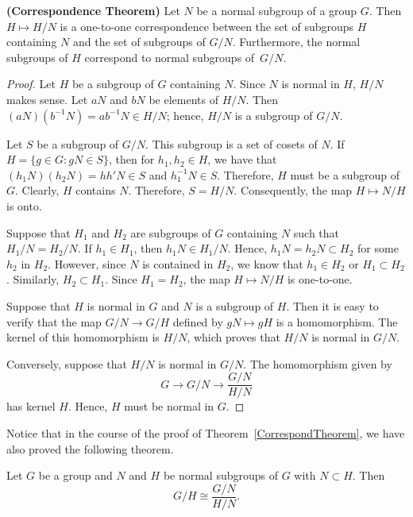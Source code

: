  
\begin{theorem} {\bf (Correspondence Theorem)}\label{CorrespondTheorem}
Let $N$ be a normal subgroup of a group $G$. Then $H \mapsto H/N$
is a one-to-one correspondence between the set of subgroups $H$
containing $N$  and the set of subgroups of $G/N$. Furthermore, the
normal subgroups of $H$ correspond to normal subgroups of~$G/N$. 
\end{theorem}
 
 
\begin{proof}
Let $H$ be a subgroup of $G$ containing $N$. Since $N$ is normal in
$H$, $H/N$ makes sense.  Let $aN$ and $bN$ be elements of $H/N$. Then
$(aN)( b^{-1} N )= ab^{-1}N \in H/N$; hence, $H/N$ is a subgroup of
$G/N$. 


Let $S$ be a subgroup of $G/N$. This subgroup is a set of cosets of
$N$.  If  $H= \{ g \in G : gN \in S \}$, then for $h_1, h_2 \in H$, we
have that $(h_1 N)( h_2 N )= h h' N \in S$ and $h_1^{-1} N \in S$.
Therefore, $H$ must be a subgroup of $G$. Clearly, $H$ contains $N$.
Therefore, $S = H / N$. Consequently, the map  $H \mapsto N/H$ is
onto. 

 
Suppose that $H_1$ and $H_2$ are subgroups of $G$ containing $N$ such
that $H_1/N = H_2/N$. If $h_1 \in H_1$, then $h_1 N \in H_1/N$. Hence,
$h_1 N = h_2 N \subset H_2$ for some $h_2$ in $H_2$. However, since
$N$ is contained in $H_2$, we know that $h_1 \in H_2$ or $H_1 \subset
H_2$. Similarly, $H_2 \subset H_1$.  Since $H_1 = H_2$, the map  $H
\mapsto N/H$ is one-to-one. 


 
Suppose that $H$ is normal in $G$ and $N$ is a subgroup of $H$.  Then
it is easy to verify that the map $G/N \rightarrow G/H$ defined by $gN
\mapsto gH$ is  a homomorphism.  The kernel of this homomorphism is
$H/N$, which proves that $H/N$ is normal in $G/N$. 
 
 
Conversely, suppose that $H/N$ is normal in $G/N$. The homomorphism
given by 
\[
G \rightarrow G/N \rightarrow \frac{G/N}{H/N}
\]
has kernel $H$. Hence, $H$ must be normal in $G$.
\end{proof}
 
\medskip
 
 
Notice that in the course of the proof of Theorem~\ref{CorrespondTheorem}, we have also
proved the following theorem. 
 
 
\begin{theorem}\label{ThirdIsoTheorem}
Let $G$ be a group and $N$ and $H$ be normal subgroups of $G$ with $N
\subset H$.  Then 
\[
G/H \cong \frac{G/N}{H/N}.
\]
\end{theorem}
 
